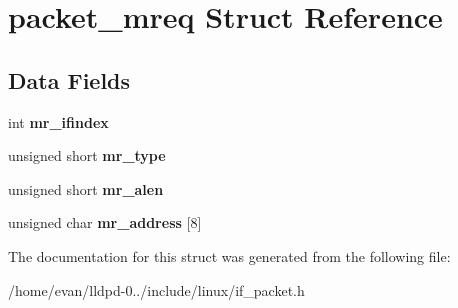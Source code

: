 \section{packet\-\_\-mreq \-Struct \-Reference}
\label{structpacket__mreq}
\subsection*{\-Data \-Fields}
\begin{DoxyCompactItemize}
\item 
int {\bfseries mr\-\_\-ifindex}\label{structpacket__mreq_a9738c2737abe80bd9a183003e32ef2c0}

\item 
unsigned short {\bfseries mr\-\_\-type}\label{structpacket__mreq_a27753add46b0da1288f42be0d56033fa}

\item 
unsigned short {\bfseries mr\-\_\-alen}\label{structpacket__mreq_a966fefb9e2bdf27a0f549f01b6e2d6db}

\item 
unsigned char {\bfseries mr\-\_\-address} [8]\label{structpacket__mreq_afa5b078fc544fd2c49d3823f22ebf760}

\end{DoxyCompactItemize}


\-The documentation for this struct was generated from the following file\-:\begin{DoxyCompactItemize}
\item 
/home/evan/lldpd-\/0../include/linux/if\-\_\-packet.\-h\end{DoxyCompactItemize}
